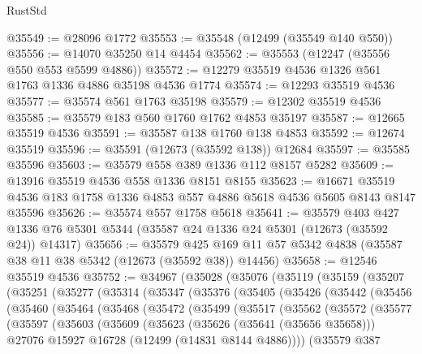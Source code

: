 \begin{lexlean}{RustStd}
\begin{coremodule}
{\begin{coremodule}
{{{{{{{{{{{{{{{{{{{{{{{{{{{{{{{{{{{{{{{{{{{{{{{{{{{{{{{{{{{{{{{{{{{{{{{{{{{{{{{{@35549 := @28096 @1772
@35553 := @35548 (@12499 (@35549 @140 @550))
@35556 := @14070 @35250 @14 @4454
@35562 := @35553 (@12247 (@35556 @550 @553 @5599 @4886))
@35572 := @12279 @35519 @4536 @1326 @561 @1763 @1336 @4886 @35198 @4536 @1774
@35574 := @12293 @35519 @4536
@35577 := @35574 @561 @1763 @35198
@35579 := @12302 @35519 @4536
@35585 := @35579 @183 @560 @1760 @1762 @4853 @35197
@35587 := @12665 @35519 @4536
@35591 := @35587 @138 @1760 @138 @4853
@35592 := @12674 @35519
@35596 := @35591 (@12673 (@35592 @138)) @12684
@35597 := @35585 @35596
@35603 := @35579 @558 @389 @1336 @112 @8157 @5282
@35609 := @13916 @35519 @4536 @558 @1336 @8151 @8155
@35623 := @16671 @35519 @4536 @183 @1758 @1336 @4853 @557 @4886 @5618 @4536 @5605 @8143 @8147 @35596
@35626 := @35574 @557 @1758 @5618
@35641 := @35579
    @403
    @427
    @1336
    @76
    @5301
    @5344
    (@35587 @24 @1336 @24 @5301 (@12673 (@35592 @24)) @14317)
@35656 := @35579
    @425
    @169
    @11
    @57
    @5342
    @4838
    (@35587 @38 @11 @38 @5342 (@12673 (@35592 @38)) @14456)
@35658 := @12546 @35519 @4536
@35752 := @34967
    (@35028
      (@35076
        (@35119
          (@35159
            (@35207
              (@35251
                (@35277
                  (@35314
                    (@35347
                      (@35376
                        (@35405
                          (@35426
                            (@35442
                              (@35456
                                (@35460
                                  (@35464
                                    (@35468
                                      (@35472
                                        (@35499
                                          (@35517
                                            (@35562
                                              (@35572
                                                (@35577
                                                  (@35597
                                                    (@35603
                                                      (@35609
                                                        (@35623
                                                          (@35626 (@35641 (@35656 @35658)))
                                                          @27076
                                                          @15927
                                                          @16728
                                                          (@12499 (@14831 @8144 @4886))))
                                                      (@35579
                                                        @387
}}}}}}}}}}}}}}}}}}}}}}}}}}}}}}}}}}}}}}}}}}}}}}}}}}}}}}}}}}}}}}}}}}}}}}}}}}}}}}}}
\end{coremodule}}
\end{coremodule}
\end{lexlean}
